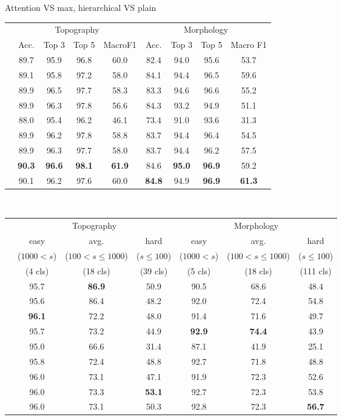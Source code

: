 \begin{frame}{Attention VS max, hierarchical VS plain}
  \tiny

  \begin{center}
    \begin{tabular}{ccccc|cccc}
    \hline
        &\multicolumn{4}{c}{Topography}&\multicolumn{4}{c}{Morphology}\\
    &Acc.&Top 3&Top 5&MacroF1&Acc.&Top 3&Top 5&Macro F1\\
    \hline
    \svm{}     &89.7&95.9&96.8&60.0&82.4&94.0&95.6&53.7\\
    \xgb{}     &89.1&95.8&97.2&58.0&84.1&94.4&96.5&59.6\\
    \hline
    \gru{}     &89.9&96.5&97.7&58.3&83.3&94.6&96.6&55.2\\
    \bert{}    &89.9&96.3&97.8&56.6&84.3&93.2&94.9&51.1\\    
    \hline
    \maxi{}    &88.0&95.4&96.2&46.1&73.4&91.0&93.6&31.3\\
    \maxh{}    &89.9&96.2&97.8&58.8&83.7&94.4&96.4&54.5\\
    \softmaxh{}&89.9&96.3&97.7&58.0&83.7&94.4&96.2&57.5\\
    \maxp{}    &\textbf{90.3}&\textbf{96.6}&\textbf{98.1}&\textbf{61.9}&84.6&\textbf{95.0}&\textbf{96.9}&59.2\\
    \softmax{} &90.1&96.2&97.6&60.0&\textbf{84.8}&94.9&\textbf{96.9}&\textbf{61.3}\\
    \hline
  \end{tabular}
\\[1cm]
    \begin{tabular}{cccc|ccc}
    \hline
    &\multicolumn{3}{c}{Topography}&\multicolumn{3}{c}{Morphology}\\
        &easy&avg.&hard&easy&avg.&hard\\
        &($1000<s$)&($100<s\leq 1000$)&($s\leq 100$)&($1000<s$)&($100<s\leq 1000$)&($s\leq 100$)\\
    &(4 cls)&(18 cls)&(39 cls)&(5 cls)&(18 cls)&(111 cls)\\
    \hline
    \svm{}     &95.7&\textbf{86.9}&50.9&90.5&68.6&48.4\\
    \xgb{}     &95.6&86.4&48.2&92.0&72.4&54.8\\
    \hline
    \gru{}     &\textbf{96.1}&72.2&48.0&91.4&71.6&49.7\\
    \bert{}    &95.7&73.2&44.9&\textbf{92.9}&\textbf{74.4}&43.9\\    
    \hline
    \maxi{}    &95.0&66.6&31.4&87.1&41.9&25.1\\
    \maxh{}    &95.8&72.4&48.8&92.7&71.8&48.8\\
    \softmaxh{}&96.0&73.1&47.1&91.9&72.3&52.6\\
    \maxp{}    &96.0&73.3&\textbf{53.1}&92.7&72.3&53.8\\
    \softmax{} &96.0&73.1&50.3&92.8&72.3&\textbf{56.7}\\
    \hline
  \end{tabular}

  \end{center}
\end{frame}

